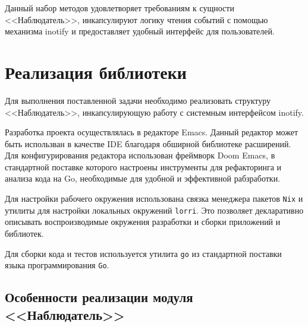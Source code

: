 \documentclass[14pt, russian]{scrartcl}
\newcommand{\code}[1]{\texttt{#1}}
\begin{document}
Данный набор методов удовлетворяет требованиям к сущности <<Наблюдатель>>,
инкапсулируют логику чтения событий с помощью механизма inotify и предоставляет
удобный интерфейс для пользователей.

\section{Реализация библиотеки}


Для выполнения поставленной задачи необходимо реализовать структуру
<<Наблюдатель>>, инкапсулирующую работу с системным интерфейсом inotify.

Разработка проекта осуществлялась в редакторе Emacs. Данный редактор может быть
использван в качестве IDE благодаря обширной библиотеке расширений. Для
конфигурирования редактора использован фреймворк Doom Emacs, в стандартной
поставке которого настроены инструменты для рефакторинга и анализа кода на Go,
необходимые для удобной и эффективной рабзработки.

Для настройки рабочего окружения использована связка менеджера пакетов
\code{Nix} и утилиты для настройки локальных окружений \code{lorri}. Это
позволяет декларативно описывать воспроизводимые окружения разработки и сборки
приложений и библиотек.

Для сборки кода и тестов используется утилита \code{go} из стандартной поставки
языка программирования \code{Go}.

\subsection{Особенности реализации модуля <<Наблюдатель>>}
\end{document}
